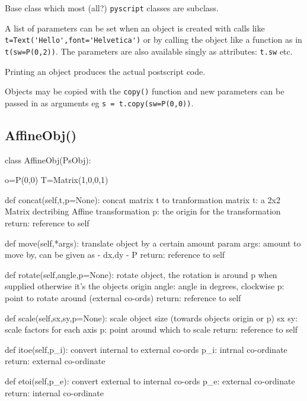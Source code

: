 \documentclass[a4paper]{book}
\begin{document}
Base class which most (all?) \Verb|pyscript| classes are subclass.

A list of parameters can be set when an object is created with
calls like \Verb|t=Text('Hello',font='Helvetica')|
or by calling the object like a function as in \Verb|t(sw=P(0,2))|.
The parameters are also available singly as attributes: \Verb|t.sw| etc.

Printing an object produces the actual postscript code.

Objects may be copied with the \Verb|copy()| function and new
parameters can be passed in as arguments eg \Verb|s = t.copy(sw=P(0,0))|.

\subsection{AffineObj()}
\label{sec:affineobj}
\begin{python}
class AffineObj(PsObj):

    o=P(0,0)
    T=Matrix(1,0,0,1)

    def concat(self,t,p=None):
        concat matrix t to tranformation matrix
          t: a 2x2 Matrix dectribing Affine transformation
          p: the origin for the transformation
          return: reference to self

    def move(self,*args):
        translate object by a certain amount
          param args: amount to move by, can be given as
            - dx,dy
            - P
          return: reference to self

    def rotate(self,angle,p=None):
        rotate object, 
        the rotation is around p when supplied otherwise
        it's the objects origin
          angle: angle in degrees, clockwise
          p: point to rotate around (external co-ords)
          return: reference to self

    def scale(self,sx,sy,p=None):
        scale object size (towards objects origin or p)
          sx sy: scale factors for each axis
          p: point around which to scale
          return: reference to self

    def itoe(self,p_i):
        convert internal to external co-ords
          p_i: intrnal co-ordinate
          return: external co-ordinate
        
    def etoi(self,p_e):
        convert external to internal co-ords
          p_e: external co-ordinate
          return: internal co-ordinate
\end{python}
\end{document}
